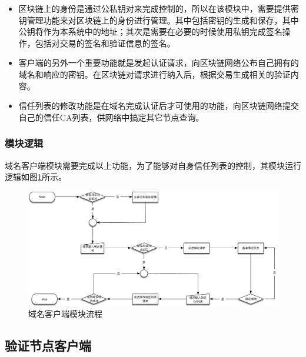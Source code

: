 \begin{itemize}
	\item 
	\noindent{}

	区块链上的身份是通过公私钥对来完成控制的，所以在该模块中，需要提供密钥管理功能来对区块链上的身份进行管理。其中包括密钥的生成和保存，其中公钥将作为本系统中的地址；其次是需要在必要的时候使用私钥完成签名操作，包括对交易的签名和验证信息的签名。

	\item 
	\noindent{}

	客户端的另外一个重要功能就是发起认证请求，向区块链网络公布自己拥有的域名和响应的密钥。在区块链对请求进行纳入后，根据交易生成相关的验证内容。

	\item
	\noindent{}

	信任列表的修改功能是在域名完成认证后才可使用的功能，向区块链网络提交自己的信任CA列表，供网络中搞定其它节点查询。

\end{itemize}

\subsubsection{模块逻辑}

域名客户端模块需要完成以上功能，为了能够对自身信任列表的控制，其模块运行逻辑如图\ref{fig:domaincli_work_flow}所示。

\begin{figure}[htbp]
 	\centering
 	\includegraphics[width=1\textwidth]{img/domaincli_work_flow}
 	\caption{域名客户端模块流程}\label{fig:domaincli_work_flow}
\end{figure}




\subsection{验证节点客户端}

